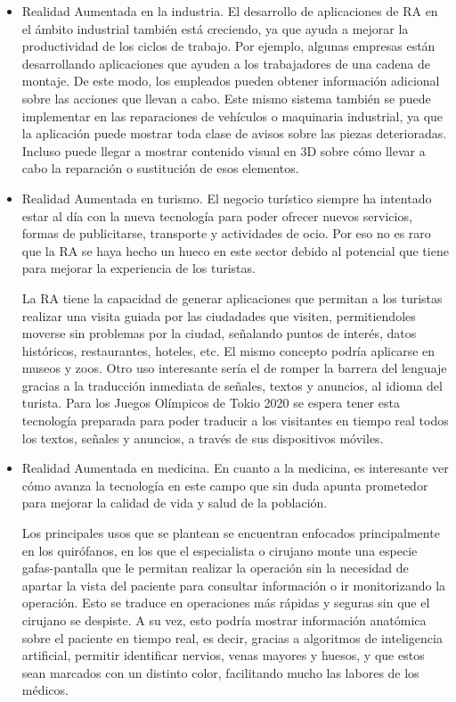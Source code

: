 \begin{itemize}
    
    
    \item Realidad Aumentada en la industria. El desarrollo de aplicaciones de RA en el ámbito industrial también está creciendo, ya que ayuda a mejorar la productividad de los ciclos de trabajo. Por ejemplo, algunas empresas están desarrollando aplicaciones que ayuden a los trabajadores de una cadena de montaje. De este modo, los empleados pueden obtener información adicional sobre las acciones que llevan a cabo. Este mismo sistema también se puede implementar en las reparaciones de vehículos o maquinaria industrial, ya que la aplicación puede mostrar toda clase de avisos sobre las piezas deterioradas. Incluso puede llegar a mostrar contenido visual en 3D sobre cómo llevar a cabo la reparación o sustitución de esos elementos. 
    

    \item Realidad Aumentada en turismo. El negocio turístico siempre ha intentado estar al día con la nueva tecnología para poder ofrecer nuevos servicios, formas de publicitarse, transporte y actividades de ocio. Por eso no es raro que la RA se haya hecho un hueco en este sector debido al potencial que tiene para mejorar la experiencia de los turistas. 
    
    La RA tiene la capacidad de generar aplicaciones que permitan a los turistas realizar una visita guiada por las ciudadades que visiten, permitiendoles moverse sin problemas por la ciudad, señalando puntos de interés, datos históricos, restaurantes, hoteles, etc. El mismo concepto podría aplicarse en museos y zoos. Otro uso interesante sería el de romper la barrera del lenguaje gracias a la traducción inmediata de señales, textos y anuncios, al idioma del turista. Para los Juegos Olímpicos de Tokio 2020 se espera tener esta tecnología preparada para poder traducir a los visitantes en tiempo real todos los textos, señales y anuncios, a través de sus dispositivos móviles.   

    

    \item Realidad Aumentada en medicina. En cuanto a la medicina, es interesante ver cómo avanza la tecnología en este campo que sin duda apunta prometedor para mejorar la calidad de vida y salud de la población.
    
    Los principales usos que se plantean se encuentran enfocados principalmente en los quirófanos, en los que el especialista o cirujano monte una especie gafas-pantalla que le permitan realizar la operación sin la necesidad de apartar la vista del paciente para consultar información o ir monitorizando la operación. Esto se traduce en operaciones más rápidas y seguras sin que el cirujano se despiste. A su vez, esto podría mostrar información anatómica sobre el paciente en tiempo real, es decir, gracias a algoritmos de inteligencia artificial, permitir identificar nervios, venas mayores y huesos, y que estos sean marcados con un distinto color, facilitando mucho las labores de los médicos.

\end{itemize}

